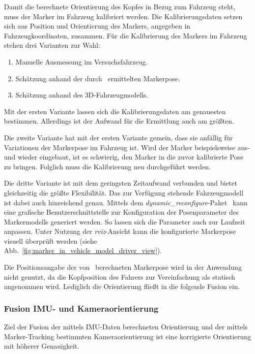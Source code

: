 Damit die berechnete Orientierung des Kopfes in Bezug zum Fahrzeug steht, muss der Marker im Fahrzeug kalibriert werden.
Die Kalibrierungsdaten setzen sich aus Position und Orientierung des Markers, angegeben in Fahrzeugkoordinaten, zusammen.
Für die Kalibrierung des Markers im Fahrzeug stehen drei Varianten zur Wahl:
\begin{enumerate}
 \item Manuelle Ausmessung im Versuchsfahrzeug.
 \item Schätzung anhand der durch \alvar \ ermittelten Markerpose.
 \item Schätzung anhand des 3D-Fahrzeugmodells.
\end{enumerate}

Mit der ersten Variante lassen sich die Kalibrierungsdaten am genauesten bestimmen.
Allerdings ist der Aufwand für die Ermittlung auch am größten.

Die zweite Variante hat mit der ersten Variante gemein, dass sie anfällig für Variationen der Markerpose im Fahrzeug ist.
Wird der Marker beispielsweise aus- und wieder eingebaut, ist es schwierig, den Marker in die zuvor kalibrierte Pose zu bringen.
Folglich muss die Kalibrierung neu durchgeführt werden.

Die dritte Variante ist mit dem geringsten Zeitaufwand verbunden und bietet gleichzeitig die größte Flexibilität.
Das zur Verfügung stehende Fahrzeugmodell ist dabei auch hinreichend genau.
Mittels dem \emph{dynamic\_reconfigure}-Paket~\cite{ros_dynamic_reconfigure} kann eine grafische Benutzerschnittstelle zur Konfiguration der Posenparameter des Markermodells generiert werden.
So lassen sich die Parameter auch zur Laufzeit anpassen.
Unter Nutzung der \emph{rviz}-Ansicht kann die konfigurierte Markerpose visuell überprüft werden (siehe Abb.~\ref{fig:marker_in_vehicle_model_driver_view}).

Die Positionsangabe der von \alvar\ berechneten Markerpose wird in der Anwendung nicht genutzt, da die Kopfposition des Fahrers zur Vereinfachung als statisch angenommen wird.
Lediglich die Orientierung fließt in die folgende Fusion ein.

\subsubsection{Fusion IMU- und Kameraorientierung}
\label{headtracking_markerfusion_subsubsec}

Ziel der Fusion der mittels IMU-Daten berechneten Orientierung und der mittels Marker-Tracking bestimmten Kameraorientierung ist eine korrigierte Orientierung mit höherer Genauigkeit.

